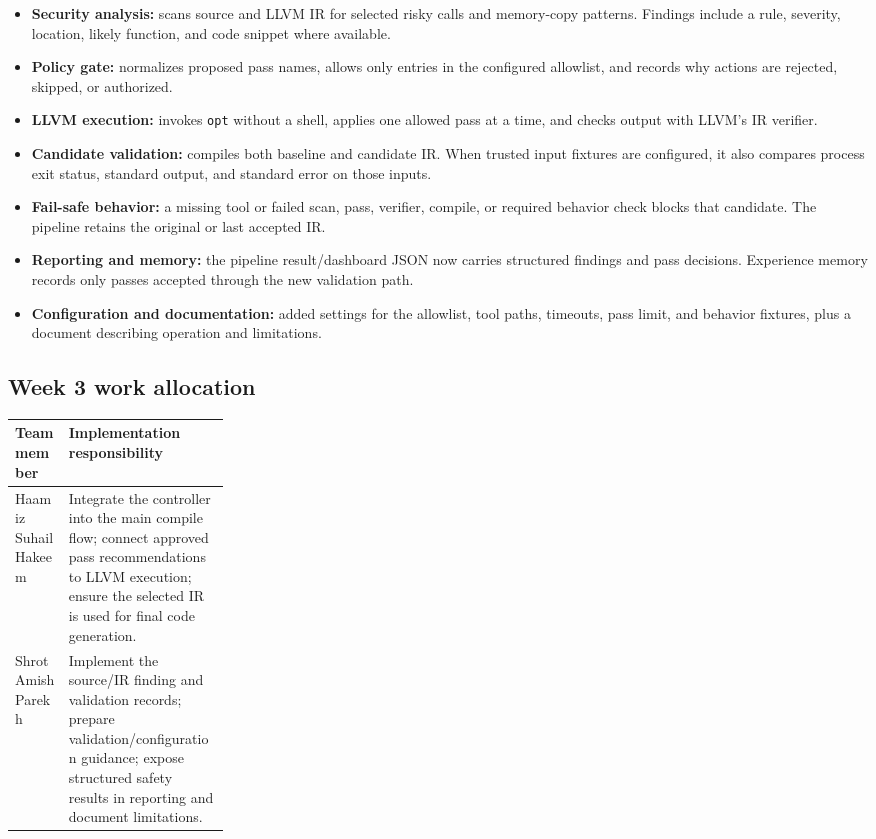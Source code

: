 \documentclass[11pt]{article}
\begin{document}
\begin{itemize}
  \item \textbf{Security analysis:} scans source and LLVM IR for selected risky calls and memory-copy patterns. Findings include a rule, severity, location, likely function, and code snippet where available.
  \item \textbf{Policy gate:} normalizes proposed pass names, allows only entries in the configured allowlist, and records why actions are rejected, skipped, or authorized.
  \item \textbf{LLVM execution:} invokes \texttt{opt} without a shell, applies one allowed pass at a time, and checks output with LLVM's IR verifier.
  \item \textbf{Candidate validation:} compiles both baseline and candidate IR. When trusted input fixtures are configured, it also compares process exit status, standard output, and standard error on those inputs.
  \item \textbf{Fail-safe behavior:} a missing tool or failed scan, pass, verifier, compile, or required behavior check blocks that candidate. The pipeline retains the original or last accepted IR.
  \item \textbf{Reporting and memory:} the pipeline result/dashboard JSON now carries structured findings and pass decisions. Experience memory records only passes accepted through the new validation path.
  \item \textbf{Configuration and documentation:} added settings for the allowlist, tool paths, timeouts, pass limit, and behavior fixtures, plus a document describing operation and limitations.
\end{itemize}

\subsection*{Week 3 work allocation}
\begin{tabularx}{\linewidth}{@{}p{0.25\linewidth}Y@{}}
\toprule
\textbf{Team member} & \textbf{Implementation responsibility} \\
\midrule
Haamiz Suhail Hakeem & Integrate the controller into the main compile flow; connect approved pass recommendations to LLVM execution; ensure the selected IR is used for final code generation. \\
Shrot Amish Parekh & Implement the source/IR finding and validation records; prepare validation/configuration guidance; expose structured safety results in reporting and document limitations. \\
\bottomrule
\end{tabularx}
\end{document}
